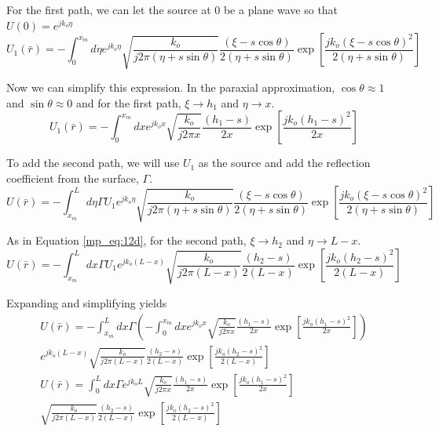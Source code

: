 For the first path, we can let the source at $0$ be a plane wave so that $U(0) = e^{jk_o\eta}$
\begin{equation}
U_1(\bar{r}) =  -\int_{0} ^{x_m} d\eta e^{jk_o\eta} \sqrt{\frac{k_o}{j2\pi(\eta+s\sin\theta)}}\frac{(\xi-s\cos\theta)}{2(\eta+s\sin\theta)}\exp\left[\frac{jk_o(\xi-s\cos\theta)^2}{2(\eta+s\sin\theta)}\right]
\label{mp_eq:12c}
\end{equation}

Now we can simplify this expression. In the paraxial approximation, $\cos\theta \approx 1$ and $\sin\theta \approx 0$ and for the first path, $\xi \rightarrow h_1$ and $\eta\rightarrow x$.
\begin{equation}
U_1(\bar{r}) =  -\int_{0} ^{x_m} dx e^{jk_ox} \sqrt{\frac{k_o}{j2\pi x}}\frac{(h_1-s)}{2x}\exp\left[\frac{jk_o(h_1-s)^2}{2x}\right]
\label{mp_eq:12d}
\end{equation}

To add the second path, we will use $U_1$ as the source and add the reflection coefficient from the surface, $\Gamma$.
\begin{equation}
U(\bar{r}) =  -\int_{x_m}^L d\eta \Gamma U_1e^{jk_o\eta} \sqrt{\frac{k_o}{j2\pi(\eta+s\sin\theta)}}\frac{(\xi-s\cos\theta)}{2(\eta+s\sin\theta)}\exp\left[\frac{jk_o(\xi-s\cos\theta)^2}{2(\eta+s\sin\theta)}\right]
\label{mp_eq:12e}
\end{equation}

As in Equation \ref{mp_eq:12d}, for the second path, $\xi \rightarrow h_2$ and $\eta\rightarrow L-x$.
\begin{equation}
U(\bar{r}) =  -\int_{x_m}^L dx \Gamma U_1 e^{jk_o(L-x)}\sqrt{\frac{k_o}{j2\pi(L-x)}}\frac{(h_2-s)}{2(L-x)}\exp\left[\frac{jk_o(h_2-s)^2}{2(L-x)}\right]
\label{mp_eq:12e}
\end{equation}

Expanding and simplifying yields
\begin{equation}
\begin{gathered}
U(\bar{r}) =  -\int_{x_m}^L dx \Gamma\left(-\int_{0} ^{x_m} dx e^{jk_ox} \sqrt{\frac{k_o}{j2\pi x}}\frac{(h_1-s)}{2x}\exp\left[\frac{jk_o(h_1-s)^2}{2x}\right]\right)  \\e^{jk_o(L-x)}\sqrt{\frac{k_o}{j2\pi(L-x)}}\frac{(h_2-s)}{2(L-x)}\exp\left[\frac{jk_o(h_2-s)^2}{2(L-x)}\right]\\
U(\bar{r}) =  \int_{0}^L dx \Gamma e^{jk_oL} \sqrt{\frac{k_o}{j2\pi x}}\frac{(h_1-s)}{2x}\exp\left[\frac{jk_o(h_1-s)^2}{2x}\right]  \\\sqrt{\frac{k_o}{j2\pi(L-x)}}\frac{(h_2-s)}{2(L-x)}\exp\left[\frac{jk_o(h_2-s)^2}{2(L-x)}\right]\\
\end{gathered}
\label{mp_eq:12f}
\end{equation}

